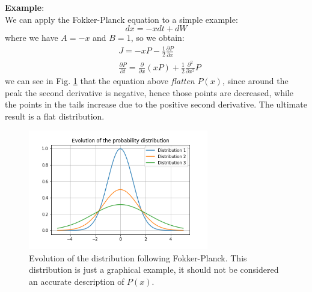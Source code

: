 \textbf{Example}:\\
\newline
We can apply the Fokker-Planck equation to a simple example:
\begin{equation*}
    dx = -xdt + dW
\end{equation*}
where we have $A=-x$ and $B=1$, so we obtain:
\begin{equation*}
\begin{split}
    & J=-xP-\frac{1}{2}\frac{\partial P}{\partial x}\\
    & \frac{\partial P}{\partial t} = \frac{\partial}{\partial x}(xP)+\frac{1}{2}\frac{\partial^2}{\partial x^2}P
    \end{split}
\end{equation*}
we can see in Fig. \ref{fok_ex} that the equation above \textit{flatten} $P(x)$, since around the peak the second derivative is negative, hence those points are decreased, while the points in the tails increase due to the positive second derivative. The ultimate result is a flat distribution.

\begin{figure}[H]
  \centering
  \includegraphics[width=0.7\textwidth]{SDE/Figures/fokker_example.png}
  \caption{Evolution of the distribution following Fokker-Planck. This distribution is just a graphical example, it should not be considered an accurate description of $P(x)$.}
  \label{fok_ex}
\end{figure}
 


